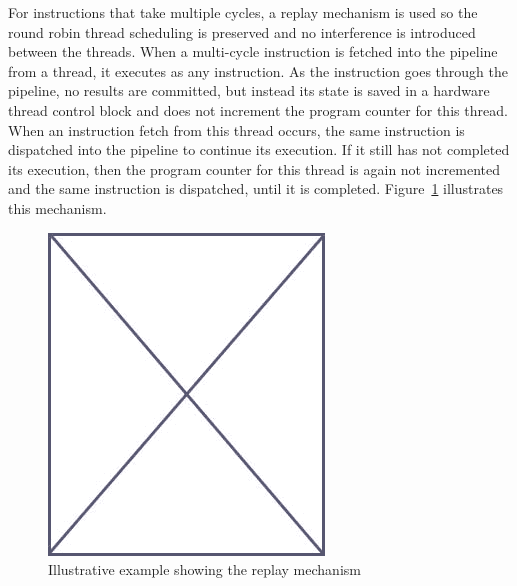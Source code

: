 For instructions that take multiple cycles, a replay mechanism is used so the round robin thread scheduling is preserved and no interference is introduced between the threads.
When a multi-cycle instruction is fetched into the pipeline from a thread, it executes as any instruction.
As the instruction goes through the pipeline, no results are committed, but instead its state is saved in a hardware thread control block and does not increment the program counter for this thread. 
When an instruction fetch from this thread occurs, the same instruction is dispatched into the pipeline to continue its execution. 
If it still has not completed its execution, then the program counter for this thread is again not incremented and the same instruction is dispatched, until it is completed. 
Figure~\ref{fig:replay_mechanism_example} illustrates this mechanism.    
\begin{figure}
\begin{center}
\includegraphics[scale=.4]{figs/placeholder}
\end{center}
\caption{Illustrative example showing the replay mechanism}
\label{fig:replay_mechanism_example}
\end{figure}

